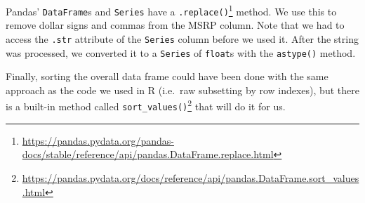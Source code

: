 \documentclass[12pt,krantz2]{krantz}
\makeatletter
\newenvironment{Shaded}{\begin{snugshade}}{\end{snugshade}}
\newcommand{\BuiltInTok}[1]{#1}
\newcommand{\CommentTok}[1]{\textcolor[rgb]{0.37,0.37,0.37}{\textit{#1}}}
\newcommand{\DecValTok}[1]{\textcolor[rgb]{0.06,0.06,0.06}{#1}}
\newcommand{\ImportTok}[1]{#1}
\newcommand{\NormalTok}[1]{#1}
\newcommand{\OperatorTok}[1]{\textcolor[rgb]{0.43,0.43,0.43}{\textbf{#1}}}
\newcommand{\StringTok}[1]{\textcolor[rgb]{0.5,0.5,0.5}{#1}}
\newcommand{\VariableTok}[1]{\textcolor[rgb]{0,0,0}{#1}}
\renewcommand{\href}[2]{#2\footnote{\url{#1}}}
\newenvironment{kframe}{%
\medskip{}
\setlength{\fboxsep}{.8em}
 \def\at@end@of@kframe{}%
 \ifinner\ifhmode%
  \def\at@end@of@kframe{\end{minipage}}%
  \begin{minipage}{\columnwidth}%
 \fi\fi%
 \def\FrameCommand##1{\hskip\@totalleftmargin \hskip-\fboxsep
 \colorbox{shadecolor}{##1}\hskip-\fboxsep
     \hskip-\linewidth \hskip-\@totalleftmargin \hskip\columnwidth}%
 \MakeFramed {\advance\hsize-\width
   \@totalleftmargin\z@ \linewidth\hsize
   \@setminipage}}%
 {\par\unskip\endMakeFramed%
 \at@end@of@kframe}
\renewenvironment{Shaded}{\begin{kframe}}{\end{kframe}}
\makeatother
\begin{document}
\begin{Shaded}
\end{Shaded}

Pandas' \texttt{DataFrame}s and \texttt{Series} have a \href{https://pandas.pydata.org/pandas-docs/stable/reference/api/pandas.DataFrame.replace.html}{\texttt{.replace()}} method. We use this to remove dollar signs and commas from the MSRP column. Note that we had to access the \texttt{.str} attribute of the \texttt{Series} column before we used it. After the string was processed, we converted it to a \texttt{Series} of \texttt{float}s with the \texttt{astype()} method.

Finally, sorting the overall data frame could have been done with the same approach as the code we used in R (i.e.~raw subsetting by row indexes), but there is a built-in method called \href{https://pandas.pydata.org/docs/reference/api/pandas.DataFrame.sort_values.html}{\texttt{sort\_values()}} that will do it for us.
\end{document}
